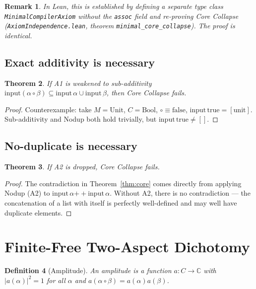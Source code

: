 ﻿\documentclass[11pt]{article}
\newtheorem{theorem}{Theorem}
\newtheorem{definition}[theorem]{Definition}
\newtheorem{remark}[theorem]{Remark}
\begin{document}
\begin{remark}
In Lean, this is established by defining a separate type
class \texttt{MinimalCompilerAxiom} without the
\texttt{assoc} field and re-proving Core Collapse
(\texttt{AxiomIndependence.lean}, theorem
\texttt{minimal\_core\_collapse}). The proof is identical.
\end{remark}

\subsection{Exact additivity is necessary}

\begin{theorem}
\label{thm:subadd-fails}
If A1 is weakened to sub-additivity
$\mathrm{input}(\alpha \circ \beta) \subseteq
 \mathrm{input}\,\alpha \cup \mathrm{input}\,\beta$,
then Core Collapse fails.
\end{theorem}

\begin{proof}
Counterexample: take $M = \mathrm{Unit}$, $C = \mathrm{Bool}$,
$\circ \equiv \mathrm{false}$,
$\mathrm{input}\,\mathrm{true} = [\mathrm{unit}]$.
Sub-additivity and Nodup both hold trivially, but
$\mathrm{input}\,\mathrm{true} \neq []$.
\end{proof}

\subsection{No-duplicate is necessary}

\begin{theorem}
\label{thm:nodup-necessary}
If A2 is dropped, Core Collapse fails.
\end{theorem}

\begin{proof}
The contradiction in Theorem~\ref{thm:core} comes directly
from applying Nodup (A2) to
$\mathrm{input}\,\alpha \mathbin{+\!+} \mathrm{input}\,\alpha$.
Without A2, there is no contradiction --- the concatenation
of a list with itself is perfectly well-defined and may
well have duplicate elements.
\end{proof}

\section{Finite-Free Two-Aspect Dichotomy}
\label{sec:dichotomy}

\begin{definition}[Amplitude]
An \emph{amplitude} is a function $a : C \to \mathbb{C}$
with $|a(\alpha)|^2 = 1$ for all $\alpha$ and
$a(\alpha \circ \beta) = a(\alpha) a(\beta)$.
\end{definition}
\end{document}
